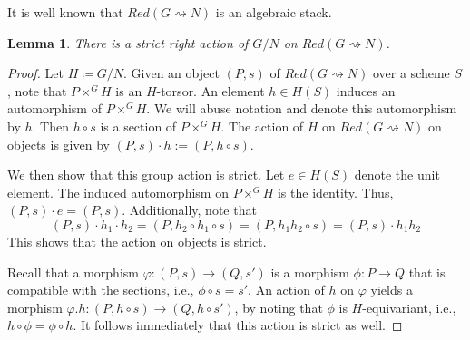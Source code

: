 \documentclass[12pt, final]{amsart}
\theoremstyle{remark}
\theoremstyle{definition}
\theoremstyle{plain}
\newtheorem{lemma}[example]{Lemma}
\newcommand{\rsa}{\rightsquigarrow}
\begin{document}
It is well known that $Red(G\rsa N)$ is an algebraic stack.
\begin{lemma}
    There is a strict right action of $G/N$ on $Red(G\rsa N)$. 
\end{lemma}

\begin{proof}
    Let $H \coloneqq G/N$. Given an object $(P,s)$ of 
    $Red(G\rsa N)$ over a scheme $S$, note that $P \times^G H$ is an $H$-torsor. 
    An element $h \in H(S)$ induces an automorphism of $P \times^G H$.
    We will abuse notation and denote this automorphism by $h$. Then $h\circ s$
    is a section of $P \times^G H$. The action of $H$ on $Red(G\rsa N)$ on 
    objects is given by $(P,s)\cdot h := (P,h\circ s)$.

    We then show that this group action is strict. 
    Let $e \in H(S)$ denote the unit element. The induced automorphism on $P \times^G H$ is the identity. Thus, 
    $(P,s)\cdot e = (P,s)$. Additionally, note that 
   $$
   (P,s)\cdot h_1\cdot h_2 = (P,h_2\circ h_1 \circ s) = (P,h_1h_2\circ s) = (P,s)\cdot h_1h_2
   $$  This shows that the action on objects is strict.
    
    
    
  
Recall that a morphism $\varphi \colon (P,s) \to (Q, s')$ is a morphism $\phi \colon P\to Q$ that is compatible with the sections, i.e., $\phi \circ s = s'$. An action of $h$ on $\varphi$ yields a morphism $\varphi.h \colon (P, h\circ s) \to (Q, h\circ s')$, by noting that $\phi$ is $H$-equivariant, i.e., $h \circ \phi = \phi \circ h$. It follows immediately that this action is strict as well.  
\end{proof}
\end{document}
